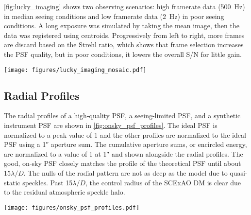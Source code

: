 \autoref{fig:lucky_imaging} shows two observing scenarios: high framerate data (\SI{500}{\hertz}) in median seeing conditions and low framerate data (\SI{2}{\hertz}) in poor seeing conditions. A long exposure was simulated by taking the mean image, then the data was registered using centroids. Progressively from left to right, more frames are discard based on the Strehl ratio, which shows that frame selection increases the PSF quality, but in poor conditions, it lowers the overall S/N for little gain.

\begin{figure*}
    \centering
    \texttt{[image: figures/lucky\_imaging\_mosaic.pdf]}
    \caption{Post-processing data with lucky imaging. All data are shown with a log stretch and separate limits for each frame. (Top) high-framerate (\SI{500}{\hertz}) data in median seeing conditions. (Bottom) low-framerate (\SI{2}{\hertz}) data in mediocre seeing conditions. (Long Exp.) a mean combination without alignment, simulating a long exposure. (Shift-and-add) co-registering each frame before collapsing. (Discarding X\%) same as shift-and-add but discarding a percentage of data based on the Strehl ratio.\label{fig:lucky_imaging}}
\end{figure*}

\subsection{Radial Profiles}
The radial profiles of a high-quality PSF, a seeing-limited PSF, and a synthetic instrument PSF are shown in \autoref{fig:onsky_psf_profiles}. The ideal PSF is normalized to a peak value of 1 and the other profiles are normalized to the ideal PSF using a \ang{;;1} aperture sum. The cumulative aperture sums, or encircled energy, are normalized to a value of 1 at \ang{;;1} and shown alongside the radial profiles. The good, on-sky PSF closely matches the profile of the theoretical PSF until about 15$\lambda/D$. The nulls of the radial pattern are not as deep as the model due to quasi-static speckles. Past 15$\lambda/D$, the control radius of the SCExAO DM is clear due to the residual atmospheric speckle halo.

\begin{figure*}
    \centering
    \texttt{[image: figures/onsky\_psf\_profiles.pdf]}
    \caption{Radial profiles and encircled energy in different observing scenarios. (Left) radial profiles normalized to an ideal PSF (gray), a high-quality on-sky PSF (the same as \autoref{fig:onsky_psf}, solid red), a poor-quality on-sky PSF (the same as \autoref{fig:bad_psfs}, dashed red), and an on-sky coronagraphic PSF with the \SI{59}{\mas} IWA (solid blue). The $1\sigma$ raw contrast curves are shown for the good PSF (dotted red) and the coronagraphic PSF (dotted blue). The control radius of the SCExAO DM is marked with a vertical gray line. (Right) the encircled energy normalized to an ideal PSF with a max radius of \ang{;;1} (gray), a good on-sky PSF (solid red), and a poor-quality PSF (dashed red). The control radius of the SCExAO DM is marked with a vertical gray line.\label{fig:onsky_psf_profiles}}
\end{figure*}


